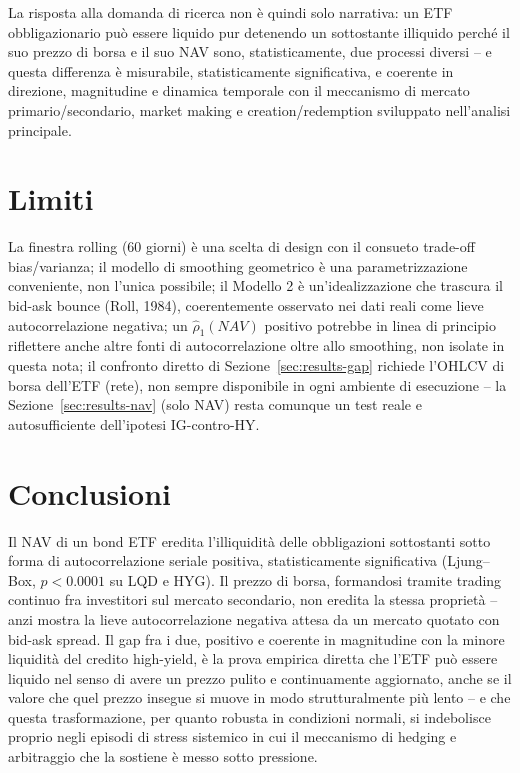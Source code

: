 \documentclass[11pt]{article}
\begin{document}
La risposta alla domanda di ricerca non \`e quindi solo narrativa: un ETF obbligazionario pu\`o essere liquido pur detenendo un sottostante illiquido perch\'e il suo prezzo di borsa e il suo NAV sono, statisticamente, due processi diversi -- e questa differenza \`e misurabile, statisticamente significativa, e coerente in direzione, magnitudine e dinamica temporale con il meccanismo di mercato primario/secondario, market making e creation/redemption sviluppato nell'analisi principale.

\section{Limiti}
\label{sec:limits}

La finestra rolling (60 giorni) \`e una scelta di design con il consueto trade-off bias/varianza; il modello di smoothing geometrico \`e una parametrizzazione conveniente, non l'unica possibile; il Modello 2 \`e un'idealizzazione che trascura il bid-ask bounce (Roll, 1984), coerentemente osservato nei dati reali come lieve autocorrelazione negativa; un $\hat\rho_1(NAV)$ positivo potrebbe in linea di principio riflettere anche altre fonti di autocorrelazione oltre allo smoothing, non isolate in questa nota; il confronto diretto di Sezione~\ref{sec:results-gap} richiede l'OHLCV di borsa dell'ETF (rete), non sempre disponibile in ogni ambiente di esecuzione -- la Sezione~\ref{sec:results-nav} (solo NAV) resta comunque un test reale e autosufficiente dell'ipotesi IG-contro-HY.

\section{Conclusioni}
\label{sec:conclusions}

Il NAV di un bond ETF eredita l'illiquidit\`a delle obbligazioni sottostanti sotto forma di autocorrelazione seriale positiva, statisticamente significativa (Ljung--Box, $p<0.0001$ su LQD e HYG). Il prezzo di borsa, formandosi tramite trading continuo fra investitori sul mercato secondario, non eredita la stessa propriet\`a -- anzi mostra la lieve autocorrelazione negativa attesa da un mercato quotato con bid-ask spread. Il gap fra i due, positivo e coerente in magnitudine con la minore liquidit\`a del credito high-yield, \`e la prova empirica diretta che l'ETF pu\`o essere liquido nel senso di avere un prezzo pulito e continuamente aggiornato, anche se il valore che quel prezzo insegue si muove in modo strutturalmente pi\`u lento -- e che questa trasformazione, per quanto robusta in condizioni normali, si indebolisce proprio negli episodi di stress sistemico in cui il meccanismo di hedging e arbitraggio che la sostiene \`e messo sotto pressione.
\end{document}
